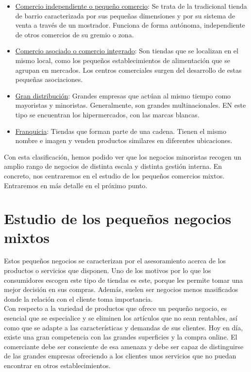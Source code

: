 \begin{itemize}
\item \underline{Comercio independiente o pequeño comercio}: Se trata de la tradicional tienda de barrio caracterizada por sus pequeñas dimensiones y por su sistema de venta a través de un mostrador. Funciona de forma autónoma, independiente de otros comercios de su gremio o zona. 
\item \underline{Comercio asociado o comercio integrado}: Son tiendas que se localizan en el mismo local, como los pequeños establecimientos de alimentación que se agrupan en mercados. Los centros comerciales surgen del desarrollo de estas pequeñas asociaciones. 
\item \underline{Gran distribución}: Grandes empresas que actúan al mismo tiempo como mayoristas y minoristas. Generalmente, son grandes multinacionales. EN este tipo se encuentran los hipermercados, con las marcas blancas.
\item \underline{Franquicia}: Tiendas que forman parte de una cadena. Tienen el mismo nombre e imagen y venden productos similares en diferentes ubicaciones. 
\end{itemize}


Con esta clasificación, hemos podido ver que los negocios minoristas recogen un amplio rango de negocios de distinta escala y distinta gestión interna. En concreto, nos centraremos en el estudio de los pequeños comercios mixtos. Entraremos en más detalle en el próximo punto. 


\section{Estudio de los pequeños negocios mixtos}

Estos pequeños negocios se caracterizan por el asesoramiento acerca de los productos o servicios que disponen. Uno de los motivos por lo que los consumidores escogen este tipo de tiendas es este, porque les permite tomar una mejor decisión en sus compras. Además, suelen ser negocios menos masificados donde la relación con el cliente toma importancia. \cite{gestionNegocio} \\

Con respecto a la variedad de productos que ofrece un pequeño negocio, es esencial que se especialice y se eliminen los artículos que no sean rentables, así como que se adapte a las características y demandas de sus clientes. Hoy en día, existe una gran competencia con las grandes superficies y la compra online. El comerciante debe ser consciente de esa amenaza y debe ser capaz de distinguirse de las grandes empresas ofreciendo a los clientes unos servicios que no puedan encontrar en otros establecimientos. \\

